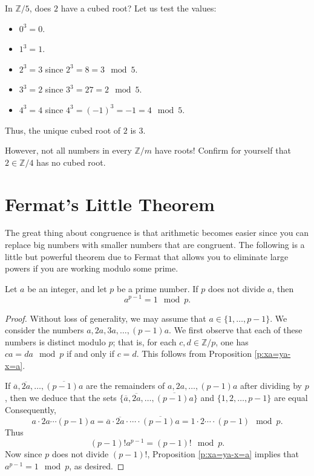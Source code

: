 \documentclass[11pt,dvipsnames]{book}
\numberwithin{equation}{section} %
\numberwithin{figure}{section} %
\numberwithin{table}{section} %
\begin{document}
\begin{example}
In $\mathbb{Z}/{5}$, does $2$ have a cubed root?    
Let us test the values: 

\begin{itemize}
\item $0^{3}=0$. 
\item $1^{3}=1$. 
\item $2^{3}=3$ since $2^{3} = 8 = 3\mod 5$.  
\item $3^{3}=2$ since $3^{3} = 27 = 2\mod 5$.  
\item $4^{3}=4$ since $4^{3} = (-1)^{3}=-1 = 4 \mod 5$.  
\end{itemize}
Thus, the unique cubed root of $2$ is $3$. \\
\end{example}
 
However, not all numbers in every $\mathbb{Z}/m$ have roots! Confirm for yourself that $2\in\mathbb{Z}/{4}$ has no cubed root. 

\section{Fermat's Little Theorem}
 
The great thing about congruence is that arithmetic  becomes easier since you can replace big numbers with smaller numbers that are congruent. The following is a little but powerful theorem due to Fermat that allows you to eliminate large powers if you are working modulo some prime. 
 
\begin{theorem}
Let $a$ be an integer, and let $p$ be a prime number.
If $p$ does not divide $a$, then
\[
a^{p-1} = 1 \mod p. 
\]
\end{theorem}

\begin{proof}
Without loss of generality, we may assume that $a \in \{1,\dots,p-1\}$.
We consider the numbers $a,2a,3a,\dots,(p-1)a$. We first observe that each of these numbers is distinct modulo $p$;
that is, for each $c,d\in \mathbb{Z}/p$, one has $ca = da\mod p$ if and only if $c=d$.
This follows from Proposition \ref{p:xa=ya-x=a}.

If $\overline{a},\overline{2a}, \dots, \overline{(p-1)a}$ are the remainders of $a,2a,\dots,(p-1)a$ after dividing by $p$, then we deduce that the sets $\{\overline{a},\overline{2a}, \dots, \overline{(p-1)a}\}$ and $\{1,2,\dots,p-1\}$ are equal
Consequently, 
\[
a\cdot 2a \cdots (p-1)a = \overline{a}\cdot\overline{2a}\cdot \cdots\cdot \overline{(p-1)a} = 1\cdot 2 \cdots \cdot (p-1) \mod p.\]
Thus
\[
(p-1)!a^{p-1} = (p-1)!\mod p.
\]
Now since $p$ does not divide $(p-1)!$, Proposition \ref{p:xa=ya-x=a} implies that $a^{p-1} = 1 \mod p$, as desired.
\end{proof}
\end{document}
